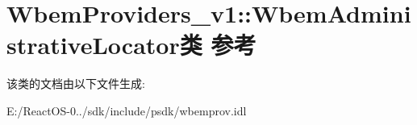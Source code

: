 \hypertarget{class_wbem_providers__v1_1_1_wbem_administrative_locator}{}\section{Wbem\+Providers\+\_\+v1\+:\+:Wbem\+Administrative\+Locator类 参考}
\label{class_wbem_providers__v1_1_1_wbem_administrative_locator}


该类的文档由以下文件生成\+:\begin{DoxyCompactItemize}
\item 
E\+:/\+React\+O\+S-\/0../sdk/include/psdk/wbemprov.\+idl\end{DoxyCompactItemize}
